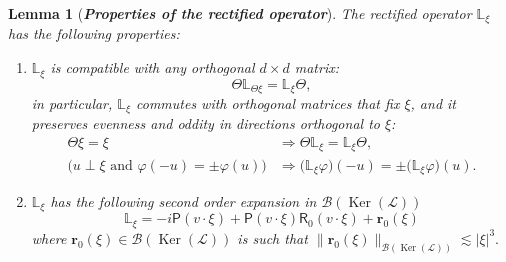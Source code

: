 \documentclass[10pt]{amsart}
\newtheorem{lemm}[theo]{Lemma}\newtheorem{prop}[theo]{Proposition}\newtheorem{coro}[theo]{Corollary}\newtheorem{conj}[theo]{Conjecture}
\theoremstyle{definition}\newtheorem{defi}[theo]{Definition}\newtheorem{rema}[theo]{Remark}\newtheorem{exam}[theo]{Example}\newtheorem{exem}[theo]{Example}\newtheorem{nota}[theo]{Notation}
\DeclareMathOperator{\nul}{Ker}
\newcommand{\sfR}{\mathsf{R}}
\newcommand{\Burr}{\mathbf{r}}
\newcommand{\rectL}{\mathbb{L}}
\newcommand{\LL}{\mathcal{L}}
\newcommand{\PP}{\mathsf{P}}
\newcommand{\BBB}{\mathscr{B}}
\begin{document}
\begin{lemm}[{\textit{\textbf{Properties of the rectified operator}}}]\label{lem:rectified_operator}
The rectified operator $\rectL_{ \xi}$ has the following properties:
\begin{enumerate}
\item $\rectL_{ \xi}$ is compatible with any orthogonal $d \times d$ matrix:
\begin{equation*}
\Theta \rectL_{\Theta \xi} = \rectL_{\xi} \Theta,
\end{equation*}
in particular, $\rectL_{\xi}$ commutes with orthogonal matrices that fix $\xi$, and it preserves evenness and oddity in directions orthogonal to $\xi$:
\begin{align*}
\Theta \xi = \xi &\Longrightarrow \Theta \rectL_{\xi} = \rectL_\xi \Theta,\\
\Big(u \perp \xi \text{ and } \varphi(-u) = \pm \varphi(u) \Big) &\Longrightarrow \Big(\rectL_{\xi} \varphi \Big)(-u) = \pm \Big(\rectL_{\xi} \varphi \Big)(u).
\end{align*}
\item $\rectL_{\xi}$ has the following second order expansion in $\BBB(\nul(\LL))$
\begin{equation*}
\rectL_{\xi} = -i \PP (v \cdot \xi) + \PP (v \cdot \xi) \sfR_{0} (v \cdot \xi) + \Burr_0 (\xi)
\end{equation*}
where $\Burr_0(\xi) \in \BBB(\nul(\LL))$ is such that $\|\Burr_0(\xi)\|_{\BBB(\nul(\LL)) } \lesssim |\xi|^3.$
\end{enumerate}
\end{lemm}
\end{document}
